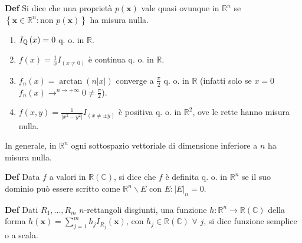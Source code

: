 \documentclass{article}
\begin{document}
\textbf{Def} Si dice che una propriet\`{a} $p\left( \mathbf{x}\right) $ vale
quasi ovunque in $%
\mathbb{R}
^{n}$ se $\left\{ \mathbf{x}\in 
\mathbb{R}
^{n}:\text{non }p\left( \mathbf{x}\right) \right\} $ ha misura nulla.

\begin{enumerate}
\item $I_{%
\mathbb{Q}
}\left( x\right) =0$ q. o. in $%
\mathbb{R}
$.

\item $f\left( x\right) =\frac{1}{x}I_{\left( x\neq 0\right) }$ \`{e}
continua q. o. in $%
\mathbb{R}
$.

\item $f_{n}\left( x\right) =\arctan \left( n\left\vert x\right\vert \right) 
$ converge a $\frac{\pi }{2}$ q. o. in $%
\mathbb{R}
$ (infatti solo se $x=0$ $f_{n}\left( x\right) \rightarrow ^{n\rightarrow
+\infty }0\neq \frac{\pi }{2}$).

\item $f\left( x,y\right) =\frac{1}{\left\vert x^{2}-y^{2}\right\vert }%
I_{\left( x\neq \pm y\right) }$ \`{e} positiva q. o. in $%
\mathbb{R}
^{2}$, ove le rette hanno misura nulla.
\end{enumerate}

In generale, in $%
\mathbb{R}
^{n}$ ogni sottospazio vettoriale di dimensione inferiore a $n$ ha misura
nulla.

\textbf{Def} Data $f$ a valori in $%
\mathbb{R}
\left( 
\mathbb{C}
\right) $, si dice che $f$ \`{e} definita q. o. in $%
\mathbb{R}
^{n}$ se il suo dominio pu\`{o} essere scritto come $%
\mathbb{R}
^{n}\backslash E$ con $E:\left\vert E\right\vert _{n}=0$.

\textbf{Def} Dati $R_{1},...,R_{m}$ $n$-rettangoli disgiunti, una funzione $%
h:%
\mathbb{R}
^{n}\rightarrow 
\mathbb{R}
\left( 
\mathbb{C}
\right) $ della forma $h\left( \mathbf{x}\right)
=\sum_{j=1}^{m}h_{j}I_{R_{j}}\left( \mathbf{x}\right) $, con $h_{j}\in 
\mathbb{R}
\left( 
\mathbb{C}
\right) $ $\forall $ $j$, si dice funzione semplice o a scala.
\end{document}
